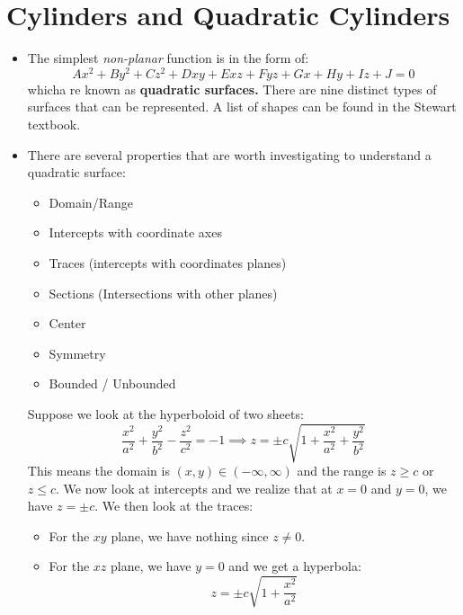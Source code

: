 \section{Cylinders and Quadratic Cylinders}
\begin{itemize}
    \item The simplest \textit{non-planar} function is in the form of:
    \begin{equation*}
        Ax^2+By^2+Cz^2 + Dxy + Exz + Fyz + Gx + Hy + Iz + J =0
    \end{equation*}
    whicha re known as \textbf{quadratic surfaces.} There are nine distinct types of surfaces that can be represented. A list of shapes can be found in the Stewart textbook.
    \item There are several properties that are worth investigating to understand a quadratic surface:
    \begin{itemize}
        \item Domain/Range
        \item Intercepts with coordinate axes
        \item Traces (intercepts with coordinates planes)
        \item Sections (Intersections with other planes)
        \item Center
        \item Symmetry
        \item Bounded / Unbounded
    \end{itemize}
    \begin{example}
        Suppose we look at the hyperboloid of two sheets:
        \begin{equation}
            \frac{x^2}{a^2}+\frac{y^2}{b^2}-\frac{z^2}{c^2}=-1 \implies z = \pm c\sqrt{1+\frac{x^2}{a^2}+\frac{y^2}{b^2}}
        \end{equation}
        This means the domain is $(x,y) \in (-\infty, \infty)$ and the range is $z \ge c$ or $z \le c$. We now look at intercepts and we realize that at $x=0$ and $y=0$, we have $z = \pm c$. We then look at the traces:
        \begin{itemize}
            \item For the $xy$ plane, we have nothing since $z \neq 0$.
            \item For the $xz$ plane, we have $y=0$ and we get a hyperbola:
            \begin{equation}
                z = \pm c\sqrt{1+\frac{x^2}{a^2}}
            \end{equation}

\end{itemize}
\end{example}
\end{itemize}
